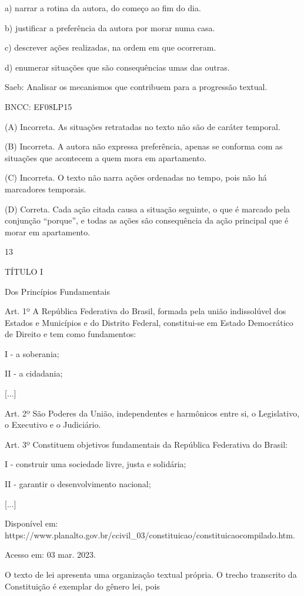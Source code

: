 a) narrar a rotina da autora, do começo ao fim do dia.

b) justificar a preferência da autora por morar numa casa.

c) descrever ações realizadas, na ordem em que ocorreram.

d) enumerar situações que são consequências umas das outras.

Saeb: Analisar os mecanismos que contribuem para a progressão textual.

BNCC: EF08LP15

(A) Incorreta. As situações retratadas no texto não são de caráter
temporal.

(B) Incorreta. A autora não expressa preferência, apenas se conforma com
as situações que acontecem a quem mora em apartamento.

(C) Incorreta. O texto não narra ações ordenadas no tempo, pois não há
marcadores temporais.

(D) Correta. Cada ação citada causa a situação seguinte, o que é marcado
pela conjunção ``porque'', e todas as ações são consequência da ação
principal que é morar em apartamento.

\num{13}

TÍTULO I

Dos Princípios Fundamentais

Art. 1º A República Federativa do Brasil, formada pela união
indissolúvel dos Estados e Municípios e do Distrito Federal,
constitui-se em Estado Democrático de Direito e tem como fundamentos:

I - a soberania;

II - a cidadania;

{[}...{]}

Art. 2º São Poderes da União, independentes e harmônicos entre si, o
Legislativo, o Executivo e o Judiciário.

Art. 3º Constituem objetivos fundamentais da República Federativa do
Brasil:

I - construir uma sociedade livre, justa e solidária;

II - garantir o desenvolvimento nacional;

{[}...{]}

Disponível em:
https://www.planalto.gov.br/ccivil\_03/constituicao/constituicaocompilado.htm.

Acesso em: 03 mar. 2023.

O texto de lei apresenta uma organização textual própria. O trecho
transcrito da Constituição é exemplar do gênero lei, pois

